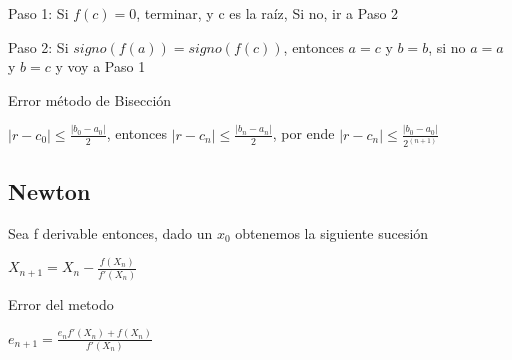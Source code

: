 \documentclass{article}
\begin{document}
Paso 1: Si $f(c) = 0 $, terminar, y c es la raíz, Si no, ir a Paso 2

Paso 2: Si $signo(f(a)) = signo(f(c))$, entonces $a = c$ y $b = b$, si no $a = a$ y $b = c$ y voy a Paso 1

  \vspace{5mm}

Error método de Bisección

$|r - c_0| \leq \frac{|b_0 - a_0|}{2}$, entonces $|r-c_n| \leq \frac{|b_n - a_n|}{2}$, por ende $|r-c_n| \leq \frac{|b_0 - a_0|}{2^{(n+1)}}$ 

\vspace{5mm}

\subsection{Newton}\label{Newton}

Sea f derivable entonces, dado un $x_0$ obtenemos la siguiente sucesión

$X_{n+1} = X_n - \frac{f(X_n)}{f'(X_n)}$

Error del metodo

$e_{n+1} = \frac{e_nf'(X_n)+f(X_n)}{f'(X_n)}$


\vspace{5mm}
\end{document}
